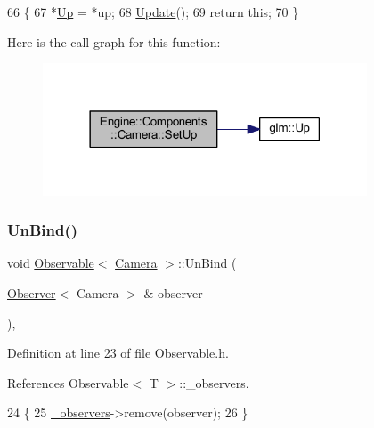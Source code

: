 \begin{DoxyCode}
66 \{
67     *\mbox{\hyperlink{classEngine_1_1Components_1_1Camera_a84a4199b9c60579a0f148b9980e05200}{Up}} = *up;
68     \mbox{\hyperlink{classEngine_1_1Components_1_1Camera_a364f5e22921e3d234b31297a64c7d932}{Update}}();
69     \textcolor{keywordflow}{return} \textcolor{keyword}{this};
70 \}
\end{DoxyCode}
Here is the call graph for this function\+:
\nopagebreak
\begin{figure}[H]
\begin{center}
\leavevmode
\includegraphics[width=273pt]{classEngine_1_1Components_1_1Camera_ac044899d9fbfa3818c99676855ec19fb_cgraph}
\end{center}
\end{figure}
\mbox{\label{classObservable_a141ac9aaacb2bf98b41349413c3487c0}} 
\subsubsection{\texorpdfstring{Un\+Bind()}{UnBind()}}
{\footnotesize\ttfamily void \mbox{\hyperlink{classObservable}{Observable}}$<$ \mbox{\hyperlink{classEngine_1_1Components_1_1Camera}{Camera}}  $>$\+::Un\+Bind (\begin{DoxyParamCaption}\item[{\mbox{\hyperlink{classObserver}{Observer}}$<$ Camera  $>$ \&}]{observer }\end{DoxyParamCaption})\hspace{0.3cm}{\ttfamily [inline]}, {\ttfamily [inherited]}}



Definition at line 23 of file Observable.\+h.



References Observable$<$ T $>$\+::\+\_\+observers.


\begin{DoxyCode}
24     \{
25         \mbox{\hyperlink{classObservable_ae6028589035c86e8a9c4375306dca702}{\_observers}}->remove(observer);
26     \}
\end{DoxyCode}
\mbox{\label{classEngine_1_1Components_1_1Camera_a364f5e22921e3d234b31297a64c7d932}} 
